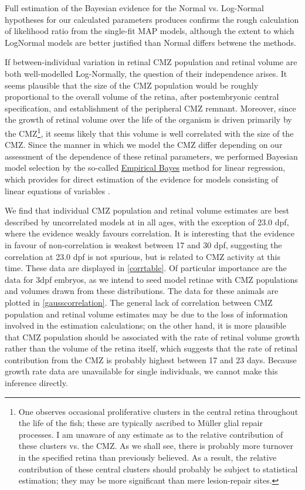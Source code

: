 Full estimation of the Bayesian evidence for the Normal vs. Log-Normal hypotheses for our calculated parameters produces confirms the rough calculation of likelihood ratio from the single-fit MAP models, although the extent to which LogNormal models are better justified than Normal differs betwene the methods.

If between-individual variation in retinal CMZ population and retinal volume are both well-modelled Log-Normally, the question of their independence arises. It seems plausible that the size of the CMZ population would be roughly proportional to the overall volume of the retina, after postembryonic central specification, and establishment of the peripheral CMZ remnant. Moreover, since the growth of retinal volume over the life of the organism is driven primarily by the CMZ\footnote{One observes occasional proliferative clusters in the central retina throughout the life of the fish; these are typically ascribed to M\"{u}ller glial repair processes. I am unaware of any estimate as to the relative contribution of these clusters vs. the CMZ. As we shall see, there is probably more turnover in the specified retina than previously believed. As a result, the relative contribution of these central clusters should probably be subject to statistical estimation; they may be more significant than mere lesion-repair sites.}, it seems likely that this volume is well correlated with the size of the CMZ. Since the manner in which we model the CMZ differ depending on our assessment of the dependence of these retinal parameters, we performed Bayesian model selection by the so-called \hyperref[ssec:EmpiricalBayes]{Empirical Bayes} method for linear regression, which provides for direct estimation of the evidence for models consisting of linear equations of variables \cite{Bishop2006}.

We find that individual CMZ population and retinal volume estimates are best described by uncorrelated models at in all ages, with the exception of 23.0 dpf, where the evidence weakly favours correlation. It is interesting that the evidence in favour of non-correlation is weakest between 17 and 30 dpf, suggesting the correlation at 23.0 dpf is not spurious, but is related to CMZ activity at this time. These data are displayed in \autoref{corrtable}. Of particular importance are the data for 3dpf embryos, as we intend to seed model retinae with CMZ populations and volumes drawn from these distributions. The data for these animals are plotted in \autoref{gausscorrelation}. The general lack of correlation between CMZ population and retinal volume estimates may be due to the loss of information involved in the estimation calculations; on the other hand, it is more plausible that CMZ population should be associated with the rate of retinal volume growth rather than the volume of the retina itself, which suggests that the rate of retinal contribution from the CMZ is probably highest between 17 and 23 days. Because growth rate data are unavailable for single individuals, we cannot make this inference directly.

